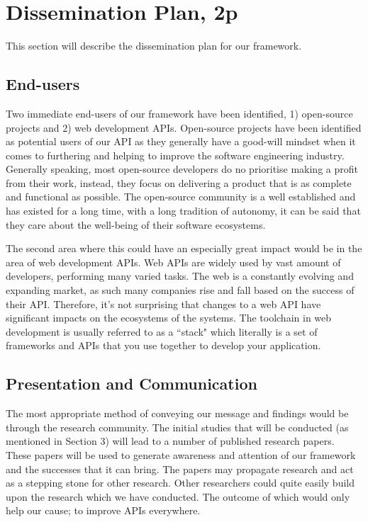 \documentclass{article}
\begin{document}
\section{Dissemination Plan, 2p}
This section will describe the dissemination plan for our framework. 

\subsection{End-users}

Two immediate end-users of our framework have been identified, 1) open-source projects and 2) web development APIs. Open-source projects have been identified as potential users of our API as they generally have a good-will mindset when it comes to furthering and helping to improve the software engineering industry. Generally speaking, most open-source developers do no prioritise making a profit from their work, instead, they focus on delivering a product that is as complete and functional as possible. The open-source community is a well established and has existed for a long time, with a long tradition of autonomy, it can be said that they care about the well-being of their software ecosystems. 

The second area where this could have an especially great impact would be in the area of web development APIs. Web APIs are widely used by vast amount of developers, performing many varied tasks. The web is a constantly evolving and expanding market, as such many companies rise and fall based on the success of their API. Therefore, it's not surprising that changes to a web API have significant impacts on the ecosystems of the systems. The toolchain in web development is usually referred to as a ``stack" which literally is a set of frameworks and APIs that you use together to develop your application.

\subsection{Presentation and Communication}
The most appropriate method of conveying our message and findings would be through the research community. The initial studies that will be conducted (as mentioned in Section 3) will lead to a number of published research papers. These papers will be used to generate awareness and attention of our framework and the successes that it can bring. The papers may propagate research and act as a stepping stone for other research. Other researchers could quite easily build upon the research which we have conducted. The outcome of which would only help our cause; to improve APIs everywhere. 
\end{document}
